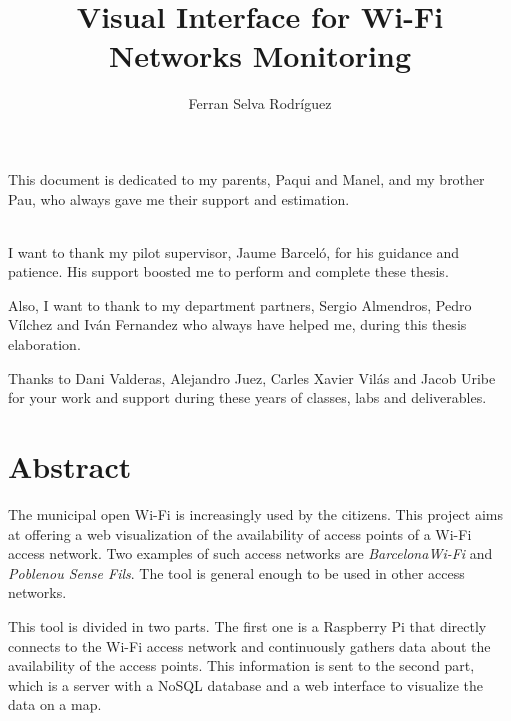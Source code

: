 \documentclass[12pt, a4paper,twoside]{tesi_upf}
\title{Visual Interface for Wi-Fi Networks Monitoring}
\author{Ferran Selva Rodríguez}
\begin{document}
\pdfstringdefDisableCommands{%
\let\MakeUppercase\relax
}

\frontmatter

\maketitle

\cleardoublepage



\noindent This document is dedicated to my parents, Paqui and Manel, and my brother Pau, who always gave me their support and estimation.

\cleardoublepage



\\[12pt] 
I want to thank my pilot supervisor, Jaume Barceló, for his
guidance and patience. His support boosted me to perform and complete these thesis.

Also, I want to thank to my department partners, Sergio Almendros, Pedro Vílchez and Iván Fernandez who always have helped me, during this thesis elaboration. 

Thanks to Dani Valderas, Alejandro Juez, Carles Xavier Vilás and Jacob Uribe for your work and support during these years of classes, labs and deliverables.
\cleardoublepage


\section*{\Large \sffamily Abstract}
The municipal open Wi-Fi is increasingly used by the citizens.
This project aims at offering a web visualization of the availability of access points of a Wi-Fi access network. Two examples of such access networks are \emph{BarcelonaWi-Fi} and \emph{Poblenou Sense Fils}. The tool is general enough to be used in other access networks. 

This tool is divided in two parts. The first one is a Raspberry Pi that directly connects to the Wi-Fi access network and continuously gathers data about the availability of the access points. This information is sent to the second part, which is a server with a NoSQL database and a web interface to visualize the data on a map.
\end{document}
